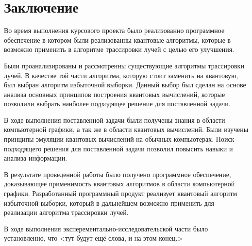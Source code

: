 \chapter*{Заключение}

Во время выполнения курсового проекта было реализованно программное обеспечение в котором были реализованны квантовые алгоритмы, которые в возможно применить в алгоритме трассировки лучей с целью его улучшения.

Были проанализированы и рассмотренны существующие алгоритмы трассировки лучей. В качестве той части алгоритма, которую стоит заменить на квантовую, был выбран алгоритм избыточной выборки. Данный выбор был сделан на основе анализа основных принципов построения квантовых вычислений, которые позволили выбрать наиболее подходящее решение для поставленной задачи.

В ходе выполнения поставленной задачи были получены знания в области компьютерной графики, а так же в области квантовых вычислений. Были изучены принципы эмуляции квантовых вычислений на обычных компьютерах. Поиск подходящего решения для поставленной задачи позволил повысить навыки и анализа информации.

В результате проведенной работы было получено программное обеспечение, доказывающее применимость квантовых алгоритмов в области компьютерной графики. Разработанный программный продукт реализует квантовый алгоритм избыточной выборки, который в дальнейшем возможно применить для реализации алгоритма трассировки лучей.

В ходе выполнения эксперементально-исследовательской части было установленно, что <тут будут ещё слова, и на этом конец.>

